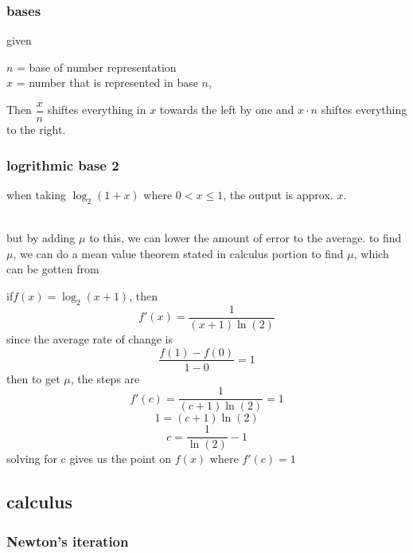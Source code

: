 \documentclass{article} %
\begin{document}
        \subsubsection{bases}
        given  \begin{center}
            $n$ = base of number representation\\
            $x$ = number that is represented in base $n$,
        \end{center}
        Then $\dfrac{x}{n}$ shiftes everything in $x$ towards the left by one and $x\cdot n$ shiftes everything to the right.
        \subsubsection{logrithmic base 2}
        when taking $\log_2(1+x)$ where $0<x \leq1$, the output is approx. $x$.\\
        \\but by adding $\mu$ to this, we can lower the amount of error to the average.
        to find $\mu$, we can do a mean value theorem stated in calculus portion to find $\mu$, which can be gotten from
        \begin{center}
            if$f(x)=\log_2(x+1)$, then $$f'(x)=\dfrac{1}{(x+1)\ln(2)}$$since the average rate of change is $$\dfrac{f(1)-f(0)}{1-0}=1$$
            then to get $\mu$, the steps are $$f'(c)=\dfrac{1}{(c+1)\ln(2)}=1$$ $$1=(c+1)\ln(2)$$ $$c=\dfrac{1}{\ln(2)}-1$$
            solving for c gives us the point on $f(x)$ where $f'(c)=1$
        \end{center}
        \begin{tikzpicture}[
            
            ]
        \end{tikzpicture}
    \subsection{calculus}
        \subsubsection{Newton's iteration}
\end{document}
